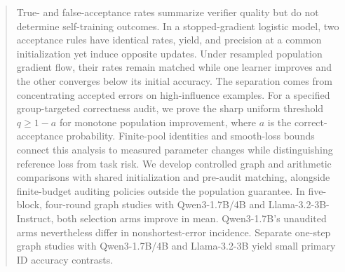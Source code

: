 \documentclass[twoside]{article}
\theoremstyle{interpretation}
\begin{document}
\raggedbottom
{}
\begin{abstract}
True- and false-acceptance rates summarize verifier quality but do not
determine self-training outcomes. In a stopped-gradient logistic model,
two acceptance rules have identical rates, yield, and precision at a common
initialization yet induce opposite updates. Under resampled population
gradient flow, their rates remain matched while one learner improves and
the other converges below its initial accuracy. The separation comes from
concentrating accepted errors on high-influence examples. For a specified
group-targeted correctness audit, we prove the sharp uniform threshold
$q\geq1-a$ for monotone population improvement, where $a$ is the
correct-acceptance probability. Finite-pool identities and smooth-loss bounds
connect this analysis to measured parameter changes while distinguishing
reference loss from task risk. We develop controlled graph and arithmetic
comparisons with shared initialization and pre-audit matching, alongside
finite-budget auditing policies outside the population guarantee. In
five-block, four-round graph studies with Qwen3-1.7B/4B and Llama-3.2-3B-Instruct, both
selection arms improve in mean.
Qwen3-1.7B's unaudited arms nevertheless differ in nonshortest-error incidence.
Separate one-step graph studies with Qwen3-1.7B/4B and Llama-3.2-3B yield
small primary ID accuracy contrasts.
\end{abstract}








\label{page:availability-start}

\clearpage
\label{page:ai-use-start}

\clearpage
\label{page:references-start}


\clearpage
\label{page:checklist-start}

\clearpage
\appendix
\onecolumn
\raggedbottom
\setlength{\parskip}{1.5pt}
\setlength{\intextsep}{5pt}
\setlength{\textfloatsep}{6pt}
\setlength{\floatsep}{5pt}
\setlength{\abovecaptionskip}{4pt}
\setlength{\belowcaptionskip}{2pt}
\setlength{\abovedisplayskip}{6pt}
\setlength{\belowdisplayskip}{6pt}
\setlength{\abovedisplayshortskip}{3pt}
\end{document}
